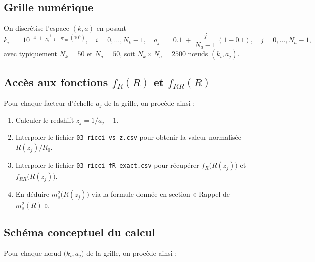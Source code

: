 \subsection{Grille numérique}
On discrétise l’espace \((k,a)\) en posant 
\[
  k_{i} \;=\; 10^{-4 \;+\;\frac{i}{N_{k}-1}\,\log_{10}(10^{4})},
  \quad
  i=0,\dots,N_{k}-1,
  \quad
  a_{j} \;=\; 0.1 \;+\;\frac{j}{N_{a}-1}\,(1 - 0.1),
  \quad
  j=0,\dots,N_{a}-1,
\]
avec typiquement \(N_{k}=50\) et \(N_{a}=50\), soit \(N_{k}\times N_{a}=2500\) nœuds \((k_{i},a_{j})\).

\subsection{Accès aux fonctions \(f_{R}(R)\) et \(f_{RR}(R)\)}
Pour chaque facteur d’échelle \(a_{j}\) de la grille, on procède ainsi :
\begin{enumerate}
  \item Calculer le redshift \(z_{j} = 1/a_{j} - 1\).
  \item Interpoler le fichier \texttt{03\_ricci\_vs\_z.csv} pour obtenir la valeur normalisée \(R(z_{j})/R_{0}\).
  \item Interpoler le fichier \texttt{03\_ricci\_fR\_exact.csv} pour récupérer \(f_{R}\bigl(R(z_{j})\bigr)\) et \(f_{RR}\bigl(R(z_{j})\bigr)\).
  \item En déduire \(m_{s}^{2}\bigl(R(z_{j})\bigr)\) via la formule donnée en section « Rappel de \(m_{s}^{2}(R)\) ».
\end{enumerate}

\subsection{Schéma conceptuel du calcul}
Pour chaque nœud \(\bigl(k_{i},a_{j}\bigr)\) de la grille, on procède ainsi :


